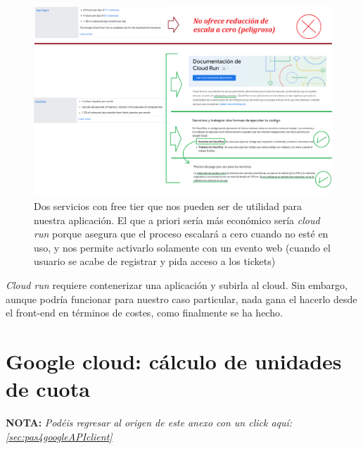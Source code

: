 \documentclass[a4paper,12pt]{report}
\begin{document}
		\FloatBarrier
		\begin{figure}[H]
			\centering
			\caption{Dos servicios con free tier que nos pueden ser de utilidad para nuestra aplicación. El que a priori sería más económico sería \textit{cloud run} porque asegura que el proceso escalará a cero cuando no esté en uso, y nos permite activarlo solamente con un evento web (cuando el usuario se acabe de registrar y pida acceso a los tickets)}
			\label{fig:googleCloud2}
			\includegraphics[width=1\linewidth]{img/googleCloud2.png}
		\end{figure}
		\FloatBarrier
		
	\textit{Cloud run} requiere contenerizar una aplicación y subirla al cloud. Sin embargo, aunque podría funcionar para nuestro caso particular, nada gana el hacerlo desde el front-end en términos de costes, como finalmente se ha hecho.
		
	\section{Google cloud: cálculo de unidades de cuota}
	\label{sec:googleQuotas}
	
	\noindent \textbf{NOTA:} \textit{Podéis regresar al origen de este anexo con un click aquí: \ref{sec:pas4googleAPIclient}} \\
	
	
	
\end{document}

